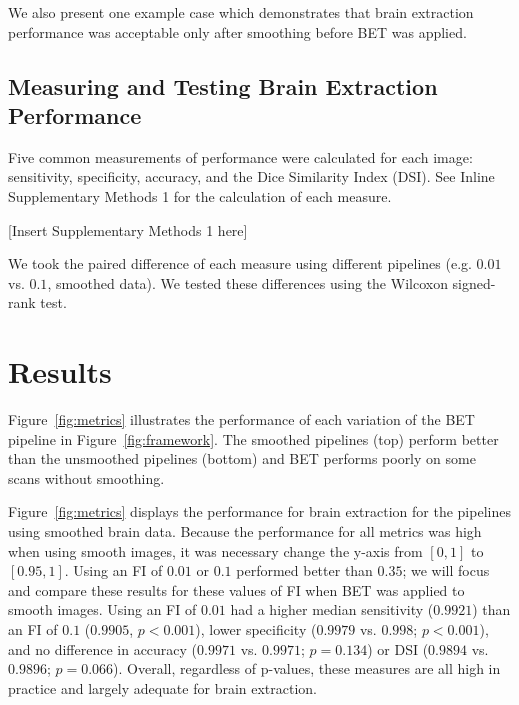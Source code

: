 \documentclass{elsarticle}\usepackage[]{graphicx}\usepackage[]{color}
\begin{document}
We also present one example case which demonstrates that brain extraction performance was acceptable only after smoothing before BET was applied.  


\subsection{Measuring and Testing Brain Extraction Performance}
Five common measurements of performance were calculated for each image: sensitivity, specificity, accuracy, and the Dice Similarity Index (DSI).  See Inline Supplementary Methods 1 for the calculation of each measure.

[Insert Supplementary Methods 1 here]

We took the paired difference of each measure using different pipelines (e.g. $0.01$ vs. $0.1$, smoothed data).  We tested these differences using the Wilcoxon signed-rank test.




\section{Results}
Figure~\ref{fig:metrics}\protect{} illustrates the performance of each variation of the BET pipeline in Figure~\ref{fig:framework}.  The smoothed pipelines (top) perform better than the unsmoothed pipelines (bottom) and BET performs poorly on some scans without smoothing.  

Figure~\ref{fig:metrics}\protect{} displays the performance for brain extraction for the pipelines using smoothed brain data.   Because the performance for all metrics was high when using smooth images, it was necessary change the y-axis from $[0,1]$ to $[0.95,1]$. 
Using an FI of $0.01$ or $0.1$ performed better than $0.35$; we will focus and compare these results for these values of FI when BET was applied to smooth images.  Using an FI of $0.01$ had a higher median sensitivity ($0.9921$) than an FI of $0.1$ ($0.9905$, $p< 0.001$), lower specificity ($0.9979$ vs. $0.998$; $p< 0.001$), and no difference in accuracy ($0.9971$ vs. $0.9971$; $p= 0.134$) or DSI ($0.9894$ vs. $0.9896$; $p= 0.066$).  Overall, regardless of p-values, these measures are all high in practice and largely adequate for brain extraction.
\end{document}

